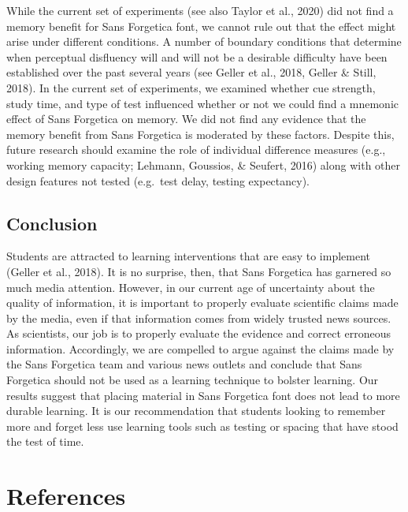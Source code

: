 \documentclass[jou]{apa6}
\begin{document}
While the current set of experiments (see also Taylor et al., 2020) did not find a memory benefit for Sans Forgetica font, we cannot rule out that the effect might arise under different conditions. A number of boundary conditions that determine when perceptual disfluency will and will not be a desirable difficulty have been established over the past several years (see Geller et al., 2018, Geller \& Still, 2018). In the current set of experiments, we examined whether cue strength, study time, and type of test influenced whether or not we could find a mnemonic effect of Sans Forgetica on memory. We did not find any evidence that the memory benefit from Sans Forgetica is moderated by these factors. Despite this, future research should examine the role of individual difference measures (e.g., working memory capacity; Lehmann, Goussios, \& Seufert, 2016) along with other design features not tested (e.g.~test delay, testing expectancy).

\hypertarget{conclusion}{%
\subsection{Conclusion}\label{conclusion}}

Students are attracted to learning interventions that are easy to implement (Geller et al., 2018). It is no surprise, then, that Sans Forgetica has garnered so much media attention. However, in our current age of uncertainty about the quality of information, it is important to properly evaluate scientific claims made by the media, even if that information comes from widely trusted news sources. As scientists, our job is to properly evaluate the evidence and correct erroneous information. Accordingly, we are compelled to argue against the claims made by the Sans Forgetica team and various news outlets and conclude that Sans Forgetica should not be used as a learning technique to bolster learning. Our results suggest that placing material in Sans Forgetica font does not lead to more durable learning. It is our recommendation that students looking to remember more and forget less use learning tools such as testing or spacing that have stood the test of time.

\newpage

\hypertarget{references}{%
\section{References}\label{references}}

\begingroup
\setlength{\parindent}{-0.5in}
\setlength{\leftskip}{0.5in}
\end{document}
